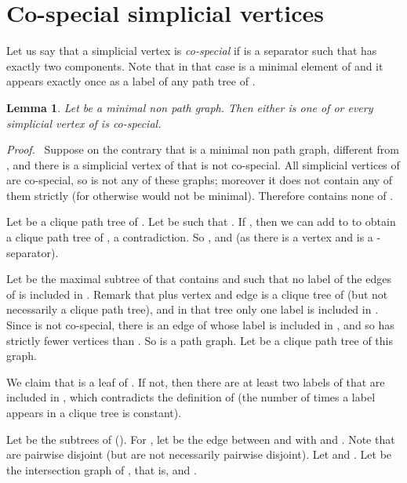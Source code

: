 \documentclass[11pt]{article}
\newtheorem{lemma}{Lemma}
\newenvironment{proof}{\noindent \emph{Proof.}\ }{\hfill
    \vspace{1em}}
\begin{document}
\section{Co-special simplicial vertices}

Let us say that a simplicial vertex  is \emph{co-special} if 
is a separator such that  has exactly two components.
Note that in that case  is a minimal element of  and
it appears exactly once as a label of any path tree of .


\begin{lemma}
\label{cospecial}
Let  be a minimal non path graph.  Then either  is one of
 or every simplicial vertex of  is
co-special.
\end{lemma}
\begin{proof}
Suppose on the contrary that  is a minimal non path graph,
different from , and there is a simplicial
vertex  of  that is not co-special.  All simplicial vertices of
 are co-special, so  is not any of these
graphs; moreover it does not contain any of them strictly (for
otherwise  would not be minimal).  Therefore  contains none of
.

Let  be a clique path tree of .  Let  be such that .  If
, then we can add  to  to obtain a clique path tree of
, a contradiction.  So , and  (as
there is a vertex  and  is a -separator).

Let  be the maximal subtree of  that contains  and such
that no label of the edges of  is included in .  Remark that
 plus vertex  and edge  is a clique tree of  (but not necessarily a clique path tree), and in
that tree only one label is included in .  Since  is not
co-special, there is an edge of  whose label is included in
, and so  has strictly fewer vertices than .  So
 is a path graph.  Let  be a clique
path tree of this graph.

We claim that  is a leaf of .  If not, then there are at least
two labels of  that are included in , which contradicts the
definition of  (the number of times a label appears in a clique
tree is constant).

Let  be the subtrees of 
().  For , let  be the edge
between  and  with  and .  Note that
 are pairwise disjoint (but  are not necessarily pairwise disjoint).  Let  and .  Let  be the intersection graph of , that is,  and
.


\end{proof}
\end{document}
